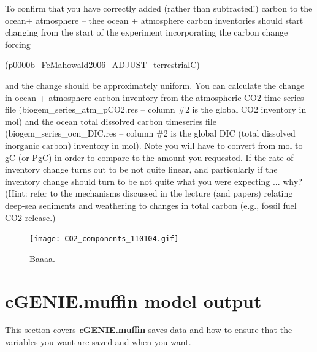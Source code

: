 \documentclass[11pt,fleqn]{book} %
\begin{document}
To confirm that you have correctly added (rather than subtracted!) carbon to the ocean+
atmosphere -- thee ocean + atmosphere carbon inventories should start changing from the
start of the experiment incorporating the carbon change forcing

(p0000b\_FeMahowald2006\_ADJUST\_terrestrialC)

and the change should be
approximately uniform. You can calculate the change in ocean + atmosphere carbon
inventory from the atmospheric CO2 time-series file (biogem\_series\_atm\_pCO2.res --
column \#2 is the global CO2 inventory in mol) and the ocean total dissolved carbon timeseries
file (biogem\_series\_ocn\_DIC.res – column \#2 is the global DIC (total dissolved
inorganic carbon) inventory in mol). Note you will have to convert from mol to gC (or PgC)
in order to compare to the amount you requested. If the rate of inventory change turns out
to be not quite linear, and particularly if the inventory change should turn to be not quite
what you were expecting ... why? (Hint: refer to the mechanisms discussed in the lecture
(and papers) relating deep-sea sediments and weathering to changes in total carbon (e.g.,
fossil fuel CO2 release.)

\begin{figure}
\texttt{[image: CO2\_components\_110104.gif]}
\caption{Baaaa.}
\label{fig:sediments}
\end{figure}


\cleardoublepage


\chapter{cGENIE.muffin model output}

\hfill \break

\vspace{24mm}

\noindent This section covers \textbf{\textit{c}GENIE.muffin} saves data and how to ensure that the variables you want are saved and when you want.
\end{document}
